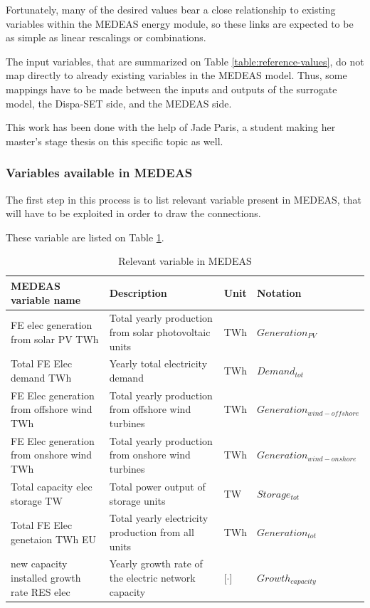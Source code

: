 Fortunately, many of the desired values bear a close relationship to existing variables within the MEDEAS energy module, so these links are expected to be as simple as linear rescalings or combinations.

The input variables, that are summarized on Table \ref{table:reference-values}, do not map directly to already existing variables in the MEDEAS model. Thus, some mappings have to be made between the inputs and outputs of the surrogate model, the Dispa-SET side, and the MEDEAS side.

This work has been done with the help of Jade Paris, a student making her master's stage thesis on this specific topic as well.

\subsubsection{Variables available in MEDEAS}

The first step in this process is to list relevant variable present in MEDEAS, that will have to be exploited in order to draw the connections.

These variable are listed on Table \ref{tab:medeas-vars}.

\begin{table}[h]
    \centering
    \begin{tabular}{|p{5cm}|p{5cm}|p{1cm}|p{4cm}|} \hline 
    MEDEAS variable name &  Description & Unit & Notation \\ \hline
     FE elec generation from solar PV TWh & Total yearly production from solar photovoltaic units & TWh & $Generation_{PV}$\\ \hline 
     Total FE Elec demand TWh & Yearly total electricity demand & TWh & $Demand_{tot}$ \\ \hline 
     FE Elec generation from offshore wind TWh & Total yearly production from offshore wind turbines & TWh & $Generation_{wind-offshore}$ \\ \hline 
     FE Elec generation from onshore wind TWh & Total yearly production from onshore wind turbines & TWh & $Generation_{wind-onshore}$ \\ \hline 
     Total capacity elec storage TW & Total power output of storage units & TW & $Storage_{tot}$ \\ \hline 
     Total FE Elec genetaion TWh EU & Total yearly electricity production from all units & TWh & $Generation_{tot}$ \\ \hline 
     new capacity installed growth rate RES elec & Yearly growth rate of the electric network capacity & [$\cdot$] & $Growth_{capacity}$ \\ \hline
    \end{tabular}
    \caption{Relevant variable in MEDEAS}
    \label{tab:medeas-vars}
\end{table}

